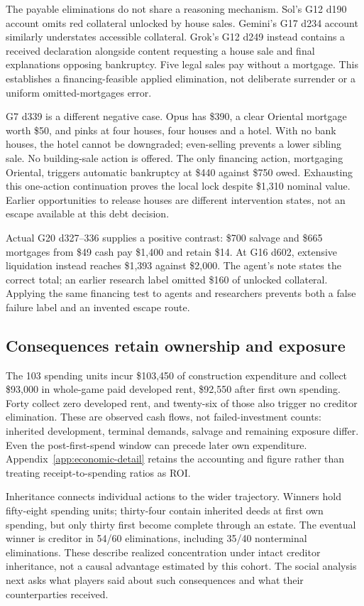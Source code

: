 The payable eliminations do not share a reasoning mechanism. Sol's G12 d190 account omits red collateral unlocked by house sales. Gemini's G17 d234 account similarly understates accessible collateral. Grok's G12 d249 instead contains a received declaration alongside content requesting a house sale and final explanations opposing bankruptcy. Five legal sales pay without a mortgage. This establishes a financing-feasible applied elimination, not deliberate surrender or a uniform omitted-mortgages error.

G7 d339 is a different negative case. Opus has \$390, a clear Oriental mortgage worth \$50, and pinks at four houses, four houses and a hotel. With no bank houses, the hotel cannot be downgraded; even-selling prevents a lower sibling sale. No building-sale action is offered. The only financing action, mortgaging Oriental, triggers automatic bankruptcy at \$440 against \$750 owed. Exhausting this one-action continuation proves the local lock despite \$1,310 nominal value. Earlier opportunities to release houses are different intervention states, not an escape available at this debt decision.

Actual G20 d327--336 supplies a positive contrast: \$700 salvage and \$665 mortgages from \$49 cash pay \$1,400 and retain \$14. At G16 d602, extensive liquidation instead reaches \$1,393 against \$2,000. The agent's note states the correct total; an earlier research label omitted \$160 of unlocked collateral. Applying the same financing test to agents and researchers prevents both a false failure label and an invented escape route.

\subsection{Consequences retain ownership and exposure}

The 103 spending units incur \$103,450 of construction expenditure and collect \$93,000 in whole-game paid developed rent, \$92,550 after first own spending. Forty collect zero developed rent, and twenty-six of those also trigger no creditor elimination. These are observed cash flows, not failed-investment counts: inherited development, terminal demands, salvage and remaining exposure differ. Even the post-first-spend window can precede later own expenditure. Appendix~\ref{app:economic-detail} retains the accounting and figure rather than treating receipt-to-spending ratios as ROI.

Inheritance connects individual actions to the wider trajectory. Winners hold fifty-eight spending units; thirty-four contain inherited deeds at first own spending, but only thirty first become complete through an estate. The eventual winner is creditor in 54/60 eliminations, including 35/40 nonterminal eliminations. These describe realized concentration under intact creditor inheritance, not a causal advantage estimated by this cohort. The social analysis next asks what players said about such consequences and what their counterparties received.
